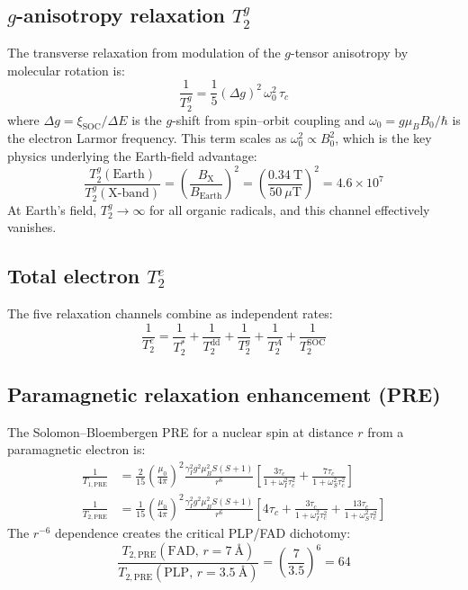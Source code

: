 \subsection{$g$-anisotropy relaxation $T_2^g$}

The transverse relaxation from modulation of the $g$-tensor anisotropy by molecular rotation is\cite{Atkins1972}:
\begin{equation}
\frac{1}{T_2^g} = \frac{1}{5}(\Delta g)^2\,\omega_0^2\,\tau_c
\label{eq:T2g}
\end{equation}
where $\Delta g = \xi_\mathrm{SOC}/\Delta E$ is the $g$-shift from spin--orbit coupling and $\omega_0 = g\mu_B B_0/\hbar$ is the electron Larmor frequency. This term scales as $\omega_0^2 \propto B_0^2$, which is the key physics underlying the Earth-field advantage:
\begin{equation}
\frac{T_2^g(\mathrm{Earth})}{T_2^g(\mathrm{X\text{-}band})} = \left(\frac{B_\mathrm{X}}{B_\mathrm{Earth}}\right)^2 = \left(\frac{0.34~\mathrm{T}}{50~\mu\mathrm{T}}\right)^2 = 4.6 \times 10^7
\end{equation}
At Earth's field, $T_2^g \rightarrow \infty$ for all organic radicals, and this channel effectively vanishes.

\subsection{Total electron $T_2^e$}

The five relaxation channels combine as independent rates:
\begin{equation}
\frac{1}{T_2^e} = \frac{1}{T_2^*} + \frac{1}{T_2^\mathrm{dd}} + \frac{1}{T_2^g} + \frac{1}{T_2^A} + \frac{1}{T_2^\mathrm{SOC}}
\label{eq:T2e_total}
\end{equation}

\subsection{Paramagnetic relaxation enhancement (PRE)}

The Solomon--Bloembergen PRE for a nuclear spin at distance $r$ from a paramagnetic electron is\cite{Solomon1955,Bloembergen1957}:
\begin{align}
\frac{1}{T_{1,\mathrm{PRE}}} &= \frac{2}{15}\left(\frac{\mu_0}{4\pi}\right)^2 \frac{\gamma_I^2 g^2 \mu_B^2 S(S+1)}{r^6} \left[\frac{3\tau_c}{1+\omega_I^2\tau_c^2} + \frac{7\tau_c}{1+\omega_S^2\tau_c^2}\right] \label{eq:PRE_T1}\\[6pt]
\frac{1}{T_{2,\mathrm{PRE}}} &= \frac{1}{15}\left(\frac{\mu_0}{4\pi}\right)^2 \frac{\gamma_I^2 g^2 \mu_B^2 S(S+1)}{r^6} \left[4\tau_c + \frac{3\tau_c}{1+\omega_I^2\tau_c^2} + \frac{13\tau_c}{1+\omega_S^2\tau_c^2}\right] \label{eq:PRE_T2}
\end{align}
The $r^{-6}$ dependence creates the critical PLP/FAD dichotomy:
\begin{equation}
\frac{T_{2,\mathrm{PRE}}(\mathrm{FAD},\,r=7~\text{\AA})}{T_{2,\mathrm{PRE}}(\mathrm{PLP},\,r=3.5~\text{\AA})} = \left(\frac{7}{3.5}\right)^6 = 64
\end{equation}

